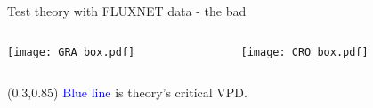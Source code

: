 \documentclass[aspectratio=169]{beamer}
\begin{document}
\begin{frame}{Test theory with FLUXNET data - the bad}
  \begin{columns}
    \begin{column}{0.5\textwidth}
      \texttt{[image: GRA\_box.pdf]}
    \end{column}
    \begin{column}{0.5\textwidth}
      \texttt{[image: CRO\_box.pdf]}
    \end{column}
  \end{columns}
      \begin{textblock*}{1.0\textwidth}(0.3\textwidth,0.85\textheight)
      \textcolor{blue}{Blue line} is theory's critical VPD.\\
  \end{textblock*}

\end{frame}



\end{document}
